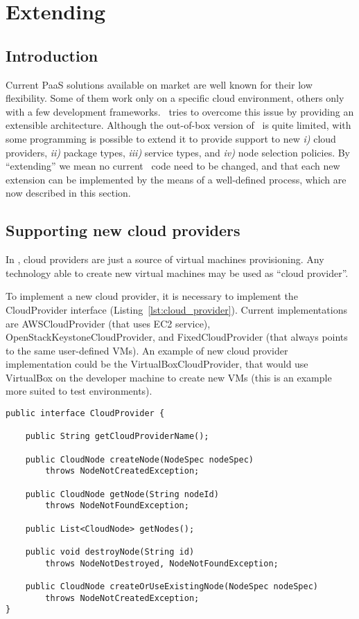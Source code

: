 
\chapter{Extending \ee}

\section{Introduction}

Current PaaS solutions available on market are well known for their low flexibility. Some of them work only on a specific cloud environment, others only with a few development frameworks. \ee\ tries to overcome this issue by providing an extensible architecture. Although the out-of-box version of \ee\ is quite limited, with some programming is possible to extend it to provide support to new \emph{i)} cloud providers, \emph{ii)} package types, \emph{iii)} service types, and \emph{iv)} node selection policies. By ``extending'' we mean no current \ee\ code need to be changed, and that each new extension can be implemented by the means of a well-defined process, which are now described in this section.

\section{Supporting new cloud providers}

In \ee, cloud providers are just a source of virtual machines provisioning. Any technology able to create new virtual machines may be used as ``cloud provider''. 

To implement a new cloud provider, it is necessary to implement the \textsf{CloudProvider} interface (Listing~\ref{lst:cloud_provider}). Current implementations are \textsf{AWSCloudProvider} (that uses EC2 service), \textsf{OpenStackKeystoneCloudProvider}, and \textsf{FixedCloudProvider} (that always points to the same user-defined VMs). An example of new cloud provider implementation could be the \textsf{VirtualBoxCloudProvider}, that would use VirtualBox on the developer machine to create new VMs (this is an example more suited to test environments).

\lstset{
language=Java,
numbers=left
}

{\footnotesize
\begin{lstlisting}[caption=\textsf{CloudProvider} interface, label=lst:cloud_provider]
public interface CloudProvider {

    public String getCloudProviderName();

    public CloudNode createNode(NodeSpec nodeSpec) 
    	throws NodeNotCreatedException;

    public CloudNode getNode(String nodeId) 
    	throws NodeNotFoundException;

    public List<CloudNode> getNodes();

    public void destroyNode(String id) 
    	throws NodeNotDestroyed, NodeNotFoundException;

    public CloudNode createOrUseExistingNode(NodeSpec nodeSpec) 
    	throws NodeNotCreatedException;
}
\end{lstlisting}
}

